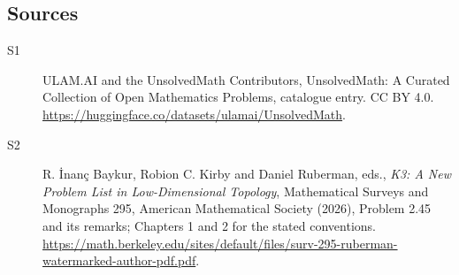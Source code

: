 \documentclass[11pt]{article}
\begin{document}
\subsection{Sources}
\begin{description}
\item[\hypertarget{source:statement:1}{S1}] ULAM.AI and the UnsolvedMath Contributors, UnsolvedMath: A Curated Collection of Open Mathematics Problems, catalogue entry. CC BY 4.0. \url{https://huggingface.co/datasets/ulamai/UnsolvedMath}.
\item[\hypertarget{source:statement:2}{S2}] R. İnanç Baykur, Robion C. Kirby and Daniel Ruberman, eds., \emph{K3: A New Problem List in Low-Dimensional Topology}, Mathematical Surveys and Monographs 295, American Mathematical Society (2026), Problem 2.45 and its remarks; Chapters 1 and 2 for the stated conventions. \url{https://math.berkeley.edu/sites/default/files/surv-295-ruberman-watermarked-author-pdf.pdf}.
\end{description}
\label{end:statement}
\end{document}
